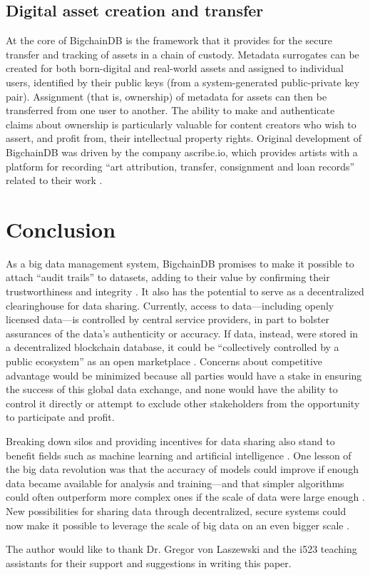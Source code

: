 \documentclass[sigconf]{acmart}
\begin{document}
\subsection{Digital asset creation and transfer}
At the core of BigchainDB is the framework that it provides for the secure transfer and tracking of assets in a chain of custody. Metadata surrogates can be created for both born-digital and real-world assets and assigned to individual users, identified by their public keys (from a system-generated public-private key pair). Assignment (that is, ownership) of metadata for assets can then be transferred from one user to another. The ability to make and authenticate claims about ownership is particularly valuable for content creators who wish to assert, and profit from, their intellectual property rights. Original development of BigchainDB was driven by the company ascribe.io, which provides artists with a platform for recording ``art attribution, transfer, consignment and loan records'' related to their work \cite{bigDB17a}.

\section{Conclusion}
As a big data management system, BigchainDB promises to make it possible to attach ``audit trails'' to datasets, adding to their value by confirming their trustworthiness and integrity \cite{tMBD16}. It also has the potential to serve as a decentralized clearinghouse for data sharing. Currently, access to data---including openly licensed data---is controlled by central service providers, in part to bolster assurances of the data's authenticity or accuracy. If data, instead, were stored in a decentralized blockchain database, it could be ``collectively controlled by a public ecosystem'' as an open marketplace \cite{tMBD16}. Concerns about competitive advantage would be minimized because all parties would have a stake in ensuring the success of this global data exchange, and none would have the ability to control it directly or attempt to exclude other stakeholders from the opportunity to participate and profit. 

Breaking down silos and providing incentives for data sharing also stand to benefit fields such as machine learning and artificial intelligence \cite{tMAI17}. One lesson of the big data revolution was that the accuracy of models could improve if enough data became available for analysis and training---and that simpler algorithms could often outperform more complex ones if the scale of data were large enough \cite{tMAI17}. New possibilities for sharing data through decentralized, secure systems could now make it possible to leverage the scale of big data on an even bigger scale \cite{tMAI17}.

\begin{acks}
The author would like to thank Dr. Gregor von Laszewski and the i523 teaching assistants for their support and suggestions in writing this paper.
\end{acks}


 
\end{document}
